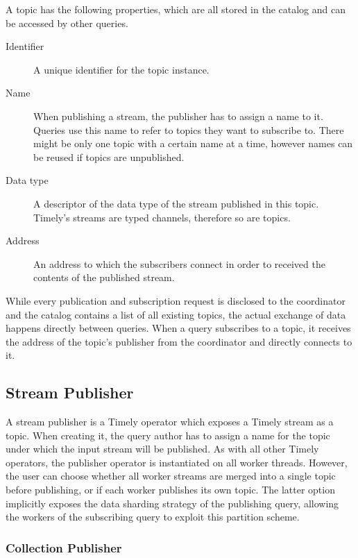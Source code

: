 A topic has the following properties, which are all stored in the catalog
and can be accessed by other queries.
\begin{description}
\item [Identifier] A unique identifier for the topic instance.
\item [Name] When publishing a stream, the publisher has to assign a name to it.
Queries use this name to refer to topics they want to subscribe to. There might
be only one topic with a certain name at a time, however names can be reused if
topics are unpublished.
\item [Data type] A descriptor of the data type of the stream published in this
topic. Timely's streams are typed channels, therefore so are topics.
\item [Address] An address to which the subscribers connect in order to received
the contents of the published stream.
\end{description}

While every publication and subscription request is disclosed to the coordinator
and the catalog contains a list of all existing topics, the
actual exchange of data happens directly between queries. When a query subscribes
to a topic, it receives the address of the topic's publisher from the coordinator
and directly connects to it.

\subsection{Stream Publisher}

A stream publisher is a Timely operator which exposes a Timely stream as a topic. When
creating it, the query author has to assign a name for the topic under which the
input stream will be published. As with all other Timely operators, the publisher
operator is instantiated on all worker threads. However, the user can choose
whether all worker streams are merged into a single topic before publishing, or
if each worker publishes its own topic. The latter option implicitly exposes
the data sharding strategy of the publishing query, allowing the workers of
the subscribing query to exploit this partition scheme.

\subsubsection{Collection Publisher}

